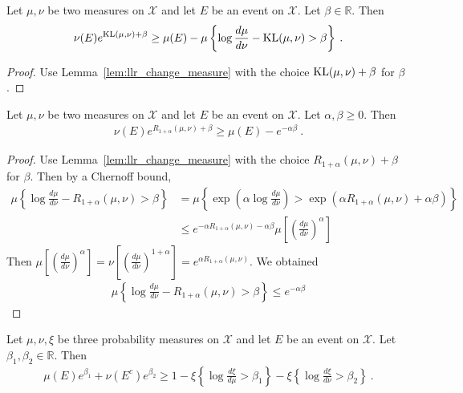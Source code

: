 \begin{corollary}
  \label{cor:kl_change_measure}
  Let $\mu, \nu$ be two measures on $\mathcal X$ and let $E$ be an event on $\mathcal X$. Let $\beta \in \mathbb{R}$. Then
  \begin{align*}
  \nu(E) e^{\operatorname{KL}(\mu, \nu) + \beta} \ge \mu(E) - \mu\left\{ \log\frac{d \mu}{d \nu} - \operatorname{KL}(\mu, \nu) > \beta \right\} \: .
  \end{align*}
\end{corollary}

\begin{proof}
Use Lemma~\ref{lem:llr_change_measure} with the choice $\operatorname{KL}(\mu, \nu) + \beta$ for $\beta$.
\end{proof}

\begin{lemma}
  \label{lem:renyi_change_measure}
  Let $\mu, \nu$ be two measures on $\mathcal X$ and let $E$ be an event on $\mathcal X$. Let $\alpha,\beta \ge 0$. Then
  \begin{align*}
  \nu(E) e^{R_{1+\alpha}(\mu, \nu) + \beta} \ge \mu(E) - e^{-\alpha \beta} \: .
  \end{align*}
\end{lemma}

\begin{proof}
Use Lemma~\ref{lem:llr_change_measure} with the choice $R_{1+\alpha}(\mu, \nu) + \beta$ for $\beta$. Then by a Chernoff bound,
\begin{align*}
\mu\left\{ \log\frac{d \mu}{d \nu} - R_{1+\alpha}(\mu, \nu) > \beta \right\}
&= \mu\left\{ \exp\left(\alpha\log\frac{d \mu}{d \nu}\right) > \exp\left(\alpha R_{1+\alpha}(\mu, \nu) + \alpha \beta\right) \right\}
\\
&\le e^{-\alpha R_{1+\alpha}(\mu, \nu) - \alpha \beta} \mu\left[\left(\frac{d \mu}{d \nu}\right)^\alpha \right]
\end{align*}
Then $\mu\left[\left(\frac{d \mu}{d \nu}\right)^\alpha \right] = \nu\left[\left(\frac{d \mu}{d \nu}\right)^{1+\alpha} \right] = e^{\alpha R_{1+\alpha}(\mu, \nu)}$. We obtained
\begin{align*}
\mu\left\{ \log\frac{d \mu}{d \nu} - R_{1+\alpha}(\mu, \nu) > \beta \right\}
\le e^{- \alpha \beta}
\end{align*}
\end{proof}

\begin{lemma}
  \label{lem:llr_change_measure_add}
  Let $\mu, \nu, \xi$ be three probability measures on $\mathcal X$ and let $E$ be an event on $\mathcal X$. Let $\beta_1, \beta_2 \in \mathbb{R}$. Then
  \begin{align*}
  \mu(E) e^{\beta_1} + \nu(E^c) e^{\beta_2} \ge 1 - \xi\left\{ \log\frac{d \xi}{d \mu} > \beta_1 \right\} - \xi\left\{ \log\frac{d \xi}{d \nu} > \beta_2 \right\} \: .
  \end{align*}
\end{lemma}

